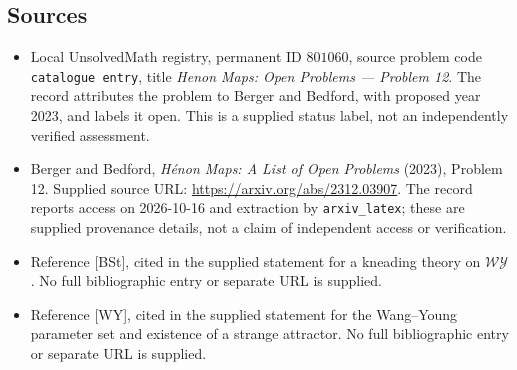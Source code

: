 \documentclass[11pt]{article}
\begin{document}
\subsection{Sources}
\begin{itemize}
\item Local UnsolvedMath registry, permanent ID \(801060\), source problem code \texttt{catalogue entry}, title \emph{Henon Maps: Open Problems --- Problem 12}. The record attributes the problem to Berger and Bedford, with proposed year 2023, and labels it open. This is a supplied status label, not an independently verified assessment.
\item Berger and Bedford, \emph{H\'enon Maps: A List of Open Problems} (2023), Problem 12. Supplied source URL: \url{https://arxiv.org/abs/2312.03907}. The record reports access on 2026-10-16 and extraction by \texttt{arxiv\_latex}; these are supplied provenance details, not a claim of independent access or verification.
\item Reference [BSt], cited in the supplied statement for a kneading theory on \(\mathcal{WY}\). No full bibliographic entry or separate URL is supplied.
\item Reference [WY], cited in the supplied statement for the Wang--Young parameter set and existence of a strange attractor. No full bibliographic entry or separate URL is supplied.
\end{itemize}
\end{document}
